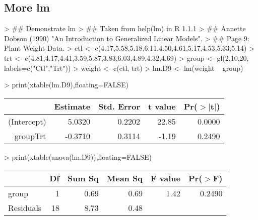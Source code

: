 \documentclass[letterpaper]{article}
\begin{document}
\subsection{More lm}
\begin{Schunk}
\begin{Sinput}
> ## Demonstrate lm
> ## Taken from help(lm) in R 1.1.1
> ## Annette Dobson (1990) "An Introduction to Generalized Linear Models".
> ## Page 9: Plant Weight Data.
> ctl <- c(4.17,5.58,5.18,6.11,4.50,4.61,5.17,4.53,5.33,5.14)
> trt <- c(4.81,4.17,4.41,3.59,5.87,3.83,6.03,4.89,4.32,4.69)
> group <- gl(2,10,20, labels=c("Ctl","Trt"))
> weight <- c(ctl, trt)
> lm.D9 <- lm(weight ~ group)
\end{Sinput}
\end{Schunk}
\begin{Schunk}
\begin{Sinput}
> print(xtable(lm.D9),floating=FALSE)
\end{Sinput}
% latex table generated in R 3.1.1 by xtable 1.7-3 package
% 
\begin{tabular}{rrrrr}
  \hline
 & Estimate & Std. Error & t value & Pr($>$$|$t$|$) \\ 
  \hline
(Intercept) & 5.0320 & 0.2202 & 22.85 & 0.0000 \\ 
  groupTrt & -0.3710 & 0.3114 & -1.19 & 0.2490 \\ 
   \hline
\end{tabular}\end{Schunk}


\begin{Schunk}
\begin{Sinput}
> print(xtable(anova(lm.D9)),floating=FALSE)
\end{Sinput}
% latex table generated in R 3.1.1 by xtable 1.7-3 package
% 
\begin{tabular}{lrrrrr}
  \hline
 & Df & Sum Sq & Mean Sq & F value & Pr($>$F) \\ 
  \hline
group & 1 & 0.69 & 0.69 & 1.42 & 0.2490 \\ 
  Residuals & 18 & 8.73 & 0.48 &  &  \\ 
   \hline
\end{tabular}\end{Schunk}
\end{document}
